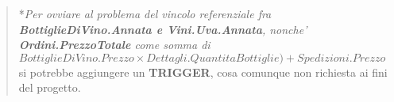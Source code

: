 \begin{center}
	
	\begin{verse}
	*\emph{Per ovviare al problema del vincolo referenziale fra 	\textbf{BottiglieDiVino.Annata e Vini.Uva.Annata}, nonche' \textbf{Ordini.PrezzoTotale} come somma di $BottiglieDiVino.Prezzo \times Dettagli.QuantitaBottiglie)+ Spedizioni.Prezzo$} si potrebbe aggiungere un \textbf{TRIGGER}, cosa comunque non richiesta ai fini del progetto.
\end{verse}

\end{center}
